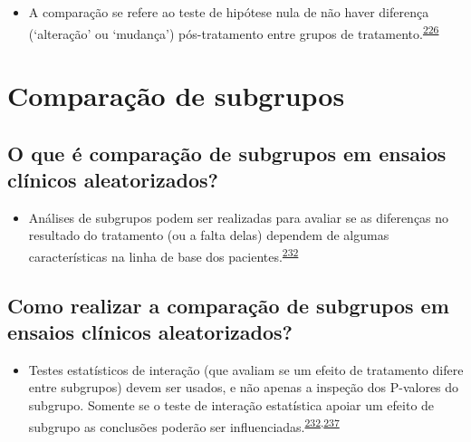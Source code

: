 \documentclass[
  a4paper,
]{book}
\providecommand{\tightlist}{%
  \setlength{\itemsep}{0pt}\setlength{\parskip}{0pt}}
\begin{document}
\begin{itemize}
\tightlist
\item
  A comparação se refere ao teste de hipótese nula de não haver diferença (`alteração' ou `mudança') pós-tratamento entre grupos de tratamento.\textsuperscript{\protect\hyperlink{ref-bland2011}{226}}
\end{itemize}

\hypertarget{comparacao-subgrupos}{%
\section{Comparação de subgrupos}\label{comparacao-subgrupos}}

\hypertarget{o-que-uxe9-comparauxe7uxe3o-de-subgrupos-em-ensaios-cluxednicos-aleatorizados}{%
\subsection{O que é comparação de subgrupos em ensaios clínicos aleatorizados?}\label{o-que-uxe9-comparauxe7uxe3o-de-subgrupos-em-ensaios-cluxednicos-aleatorizados}}

\begin{itemize}
\tightlist
\item
  Análises de subgrupos podem ser realizadas para avaliar se as diferenças no resultado do tratamento (ou a falta delas) dependem de algumas características na linha de base dos pacientes.\textsuperscript{\protect\hyperlink{ref-Assmann2000}{232}}
\end{itemize}

\hypertarget{como-realizar-a-comparauxe7uxe3o-de-subgrupos-em-ensaios-cluxednicos-aleatorizados}{%
\subsection{Como realizar a comparação de subgrupos em ensaios clínicos aleatorizados?}\label{como-realizar-a-comparauxe7uxe3o-de-subgrupos-em-ensaios-cluxednicos-aleatorizados}}

\begin{itemize}
\tightlist
\item
  Testes estatísticos de interação (que avaliam se um efeito de tratamento difere entre subgrupos) devem ser usados, e não apenas a inspeção dos P-valores do subgrupo. Somente se o teste de interação estatística apoiar um efeito de subgrupo as conclusões poderão ser influenciadas.\textsuperscript{\protect\hyperlink{ref-Assmann2000}{232},\protect\hyperlink{ref-Brookes2004}{237}}
\end{itemize}
\end{document}
